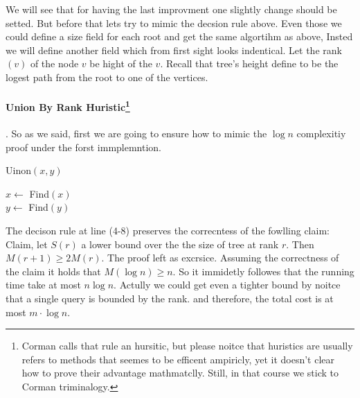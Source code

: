   We will see that for having the last improvment one slightly change should be setted. But before that lets try to mimic the decsion rule above. Even those we could define a size field for each root and get the same algortihm as above, Insted we will define another field which from first sight looks indentical. Let the rank$\left( v \right)$ of the node $v$ be hight of the $v$. Recall that tree's height define to be the logest path from the root to one of the vertices. 
 
  \paragraph{Union By Rank Huristic\protect\footnote{Corman calls that rule an hursitic, but please noitce that huristics are usually refers to methods that seemes to be efficent ampiricly, yet it doesn't clear how to prove their advantage mathmatclly. Still, in that course we stick to Corman triminalogy.}}. So as we said, first we are going to ensure how to mimic the $\log n$ complexitiy proof under the forst immplemntion. 

  \begin{algbox}{Uinon$(x,y)$}
  \begin{algorithm}[H]
    $x\leftarrow $ Find$\left( x \right)$ \\
    $y\leftarrow $ Find$\left( y \right)$ \\
  \end{algorithm}
\end{algbox}
The decison rule at line (4-8) preserves the correcntess of the fowlling claim:
Claim, let $S(r)$ a lower bound over the the size of tree at rank $r$. Then $M\left( r+1 \right) \ge 2M\left( r \right)$. The proof left as excrsice. Assuming the correctness of the claim it holds that $M\left( \log n \right) \ge n $. So it immidetly followes that the running time take at most $n\log n$. Actully we could get even a tighter bound by noitce that a single query is bounded by the rank. and therefore, the total cost is at most $m \cdot \log n$. 

